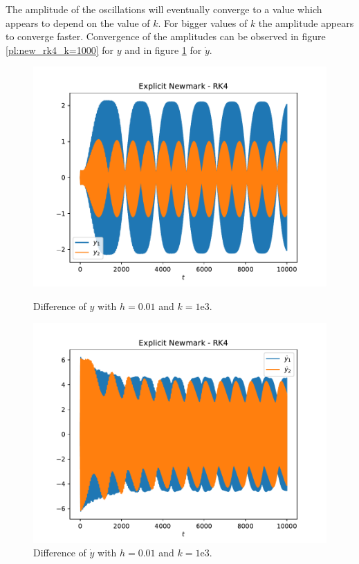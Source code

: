 \documentclass{report}
\begin{document}
The amplitude of the oscillations will eventually converge to a value which appears to depend on the value of $k$. For bigger values of $k$ the amplitude appears to converge faster. Convergence of the amplitudes can be observed in figure \ref{pl:new_rk4_k=1000} for $y$ and in figure \ref{pl:new_rk4_k=1000_dot} for $\dot{y}$.

\begin{figure}[h]
\centering
\begin{minipage}[t]{0.45\textwidth}
\centering
\includegraphics[width=\textwidth]{../Plots/Diff_Proj3/Real/New-RK4_k=1E3_t=1E5_y}
\caption{Difference of $y$ with $h=0.01$ and $k=1\mathrm{e}{3}$.}
\label{pl:new_rk4_k=1000}
\end{minipage}
\hfill
\begin{minipage}[t]{0.45\textwidth}
\centering
\includegraphics[width=\textwidth]{../Plots/Diff_Proj3/Real/New-RK4_k=1E3_t=1E5_ydot}
\caption{Difference of $\dot{y}$ with $h=0.01$ and $k=1\mathrm{e}{3}$.}
\label{pl:new_rk4_k=1000_dot}
\end{minipage}
\end{figure}
\end{document}
